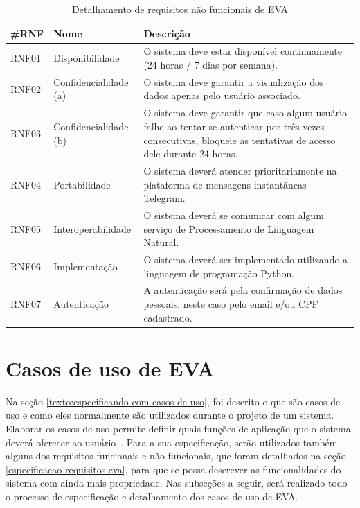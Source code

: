 \begin{table}[htb!]
\caption{Detalhamento de requisitos não funcionais de EVA}
\label{tabela:tabela2}
\center
\footnotesize
\begin{tabular}{|p{1.2cm}|p{3.5cm}|p{7.5cm}|}
  \hline
   \textbf{\#RNF} & \textbf{Nome}  & \textbf{Descrição}  \\
   \hline
    RNF01 & Disponibilidade & O sistema deve estar disponível continuamente (24 horas / 7 dias por semana). \\
   \hline
    RNF02 & Confidencialidade (a) & O sistema deve garantir a visualização dos dados apenas pelo usuário associado. \\
   \hline
    RNF03 & Confidencialidade (b) & O sistema deve garantir que caso algum usuário falhe ao tentar se autenticar por três vezes consecutivas, bloqueie as tentativas de acesso dele durante 24 horas. \\
   \hline
   RNF04 & Portabilidade & O sistema deverá atender prioritariamente na plataforma de mensagens instantâneas Telegram. \\
   \hline
    RNF05 & Interoperabilidade & O sistema deverá se comunicar com algum serviço de Processamento de Linguagem Natural. \\
   \hline
    RNF06 & Implementação & O sistema deverá ser implementado utilizando a linguagem de programação Python. \\
   \hline
    RNF07 & Autenticação & A autenticação será pela confirmação de dados pessoais, neste caso pelo email e/ou CPF cadastrado. \\
   \hline
   
\end{tabular}
\end{table}\label{tabela:3}

\section{Casos de uso de EVA}\label{casos-de-uso-eva}

Na seção \ref{texto:especificando-com-casos-de-uso}, foi descrito o que são casos de uso e como eles normalmente são utilizados durante o projeto de um sistema. 
Elaborar os casos de uso permite definir quais funções de aplicação que o sistema deverá oferecer ao usuário~\cite{ReqJair}. 
Para a sua especificação, serão utilizados também alguns dos requisitos funcionais e não funcionais, que foram detalhados na seção \ref{especificacao-requisitos-eva}, para que se possa descrever as funcionalidades do sistema com ainda mais propriedade. 
Nas subseções a seguir, será realizado todo o processo de especificação e detalhamento dos casos de uso de EVA.


